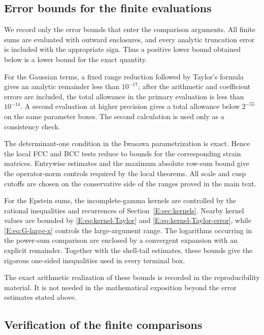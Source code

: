 \documentclass[reqno,english]{amsart}
\theoremstyle{definition}
\newtheorem{open problem}[theorem]{Open Problem}
\theoremstyle{remark}
\theoremstyle{plain}
\numberwithin{equation}{section}
\begin{document}
\subsection{Error bounds for the finite evaluations}\label{T:sec:arithmetic}\label{E:sec:arithmetic}

We record only the error bounds that enter the comparison arguments. All
finite sums are evaluated with outward enclosures, and every analytic
truncation error is included with the appropriate sign. Thus a positive
lower bound obtained below is a lower bound for the exact quantity.

For the Gaussian terms, a fixed range reduction followed by Taylor's
formula gives an analytic remainder less than $10^{-17}$; after the
arithmetic and coefficient errors are included, the total allowance in
the primary evaluation is less than $10^{-14}$. A second evaluation at
higher precision gives a total allowance below $2^{-55}$ on the same
parameter boxes. The second calculation is used only as a consistency
check.

The determinant-one condition in the Iwasawa parametrization is exact.
Hence the local FCC and BCC tests reduce to bounds for the corresponding
strain matrices. Entrywise estimates and the maximum absolute row-sum
bound give the operator-norm controls required by the local theorems. All
scale and cusp cutoffs are chosen on the conservative side of the ranges
proved in the main text.

For the Epstein sums, the incomplete-gamma kernels are controlled by the
rational inequalities and recurrences of Section~\ref{E:sec:kernels}.
Nearby kernel values are bounded by \eqref{E:eq:kernel-Taylor} and
\eqref{E:eq:kernel-Taylor-error}, while \eqref{E:eq:G-large-x} controls
the large-argument range. The logarithms occurring in the power-sum
comparison are enclosed by a convergent expansion with an explicit
remainder. Together with the shell-tail estimates, these bounds give the
rigorous one-sided inequalities used in every terminal box.

The exact arithmetic realization of these bounds is recorded in the
reproducibility material. It is not needed in the mathematical exposition
beyond the error estimates stated above.

\subsection{Verification of the finite comparisons}\label{T:sec:certificates}\label{E:sec:execution}\label{E:sec:exterior2}\label{app:power-records}\label{app:comparison-checks}
\end{document}
